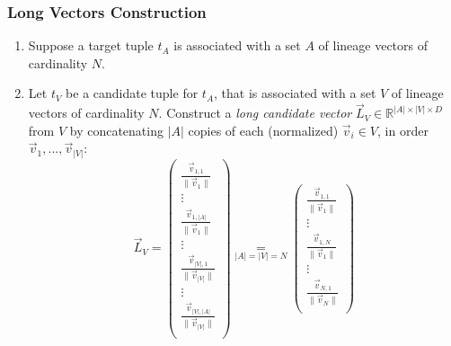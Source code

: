\subsubsection{Long Vectors Construction}
\begin{enumerate}
    \item Suppose a target tuple $t_A$ is associated with a set $A$ of lineage vectors of cardinality $N$.
    \item Let $t_V$ be a candidate tuple for $t_A$, that is associated with a set $V$ of lineage vectors of cardinality $N$. Construct a \textit{long candidate vector} $\vec{L}_V \in \mathbb{R}^{|A| \times |V| \times D}$ from $V$ by concatenating $|A|$ copies of each (normalized) $\vec{v}_i \in V$, in order $\vec{v}_1, ..., \vec{v}_{|V|}$: \\
    \begin{equation*}
        \vec{L}_V = \begin{pmatrix}
                    \frac{\vec{v}_{1, 1}}{\lVert \vec{v}_1 \rVert}\\ 
                    \vdots\\ 
                    \frac{\vec{v}_{1, |A|}}{\lVert \vec{v}_1 \rVert}\\ 
                   \vdots\\ 
                   \frac{\vec{v}_{|V|, 1}}{\lVert \vec{v}_{|V|} \rVert}\\ 
                   \vdots\\ 
                   \frac{\vec{v}_{|V|, |A|}}{\lVert \vec{v}_{|V|} \rVert}\\
                   \end{pmatrix}
                  \underset{\scriptscriptstyle |A| = |V| = N}{=} 
                  \begin{pmatrix}
                    \frac{\vec{v}_{1, 1}}{\lVert \vec{v}_1 \rVert}\\ 
                    \vdots\\ 
                    \frac{\vec{v}_{1, N}}{\lVert \vec{v}_1 \rVert}\\ 
                   \vdots\\ 
                   \frac{\vec{v}_{N, 1}}{\lVert \vec{v}_N \rVert}\\ 

\end{pmatrix}
\end{equation*}
\end{enumerate}
